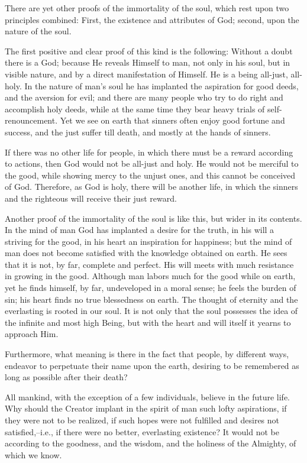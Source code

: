 There are yet other proofs of the immortality of the soul, which rest upon two principles combined: First, the existence and attributes of God; second, upon the nature of the soul.

The first positive and clear proof of this kind is the following: Without a doubt there is a God; because He reveals Himself to man, not only in his soul, but in visible nature, and by a direct manifestation of Himself. He is a being all-just, all-holy. In the nature of man's soul he has implanted the aspiration for good deeds, and the aversion for evil; and there are many people who try to do right and accomplish holy deeds, while at the same time they bear heavy trials of self-renouncement. Yet we see on earth that sinners often enjoy good fortune and success, and the just suffer till death, and mostly at the hands of sinners.

If there was no other life for people, in which there must be a reward according to actions, then God would not be all-just and holy. He would not be merciful to the good, while showing mercy to the unjust ones, and this cannot be conceived of God. Therefore, as God is holy, there will be another life, in which the sinners and the righteous will receive their just reward.

Another proof of the immortality of the soul is like this, but wider in its contents. In the mind of man God has implanted a desire for the truth, in his will a striving for the good, in his heart an inspiration for happiness; but the mind of man does not become satisfied with the knowledge obtained on earth. He sees that it is not, by far, complete and perfect. His will meets with much resistance in growing in the good. Although man labors much for the good while on earth, yet he finds himself, by far, undeveloped in a moral sense; he feels the burden of sin; his heart finds no true blessedness on earth. The thought of eternity and the everlasting is rooted in our soul. It is not only that the soul possesses the idea of the infinite and most high Being, but with the heart and will itself it yearns to approach Him.

Furthermore, what meaning is there in the fact that people, by different ways, endeavor to perpetuate their name upon the earth, desiring to be remembered as long as possible after their death?

All mankind, with the exception of a few individuals, believe in the future life. Why should the Creator implant in the spirit of man such lofty aspirations, if they were not to be realized, if such hopes were not fulfilled and desires not satisfied,--i.e., if there were no better, everlasting existence? It would not be according to the goodness, and the wisdom, and the holiness of the Almighty, of which we know.

